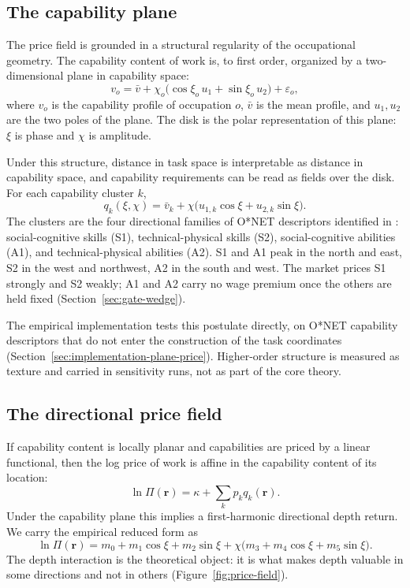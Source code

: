 \documentclass[12pt, a4paper]{article}
\begin{document}
\subsection{The capability plane}
\label{sec:capability-plane}

The price field is grounded in a structural regularity of the
occupational geometry. The capability content of work is, to first
order, organized by a two-dimensional plane in capability space:
\begin{equation}
  v_o
  =
  \bar v
  +
  \chi_o
  \bigl(
    \cos\xi_o\,u_1
    +
    \sin\xi_o\,u_2
  \bigr)
  +
  \varepsilon_o,
  \label{eq:capability-plane}
\end{equation}
where $v_o$ is the capability profile of occupation $o$, $\bar v$ is
the mean profile, and $u_1,u_2$ are the two poles of the plane. The disk
is the polar representation of this plane: $\xi$ is phase and $\chi$ is
amplitude.

Under this structure, distance in task space is interpretable as
distance in capability space, and capability requirements can be read as
fields over the disk. For each capability cluster $k$,
\begin{equation}
  q_k(\xi,\chi)
  =
  \bar v_k
  +
  \chi
  \bigl(
    u_{1,k}\cos\xi
    +
    u_{2,k}\sin\xi
  \bigr).
  \label{eq:capability-field}
\end{equation}
The clusters are the four directional families of O*NET descriptors
identified in \textcite{storck2026geometry}: social-cognitive skills
(S1), technical-physical skills (S2), social-cognitive abilities (A1),
and technical-physical abilities (A2). S1 and A1 peak in the north and
east, S2 in the west and northwest, A2 in the south and west. The
market prices S1 strongly and S2 weakly; A1 and A2 carry no wage
premium once the others are held fixed
(Section~\ref{sec:gate-wedge}).

The empirical implementation tests this postulate directly, on O*NET
capability descriptors that do not enter the construction of the task
coordinates (Section~\ref{sec:implementation-plane-price}).
Higher-order structure is measured as texture and carried in sensitivity
runs, not as part of the core theory.

\subsection{The directional price field}
\label{sec:directional-price}

If capability content is locally planar and capabilities are priced by
a linear functional, then the log price of work is affine in the
capability content of its location:
\[
  \ln \Pi(\mathbf{r})
  =
  \kappa
  +
  \sum_k p_k q_k(\mathbf{r}).
\]
Under the capability plane this implies a first-harmonic directional
depth return. We carry the empirical reduced form as
\begin{equation}
  \ln \Pi(\mathbf{r})
  =
  m_0 + m_1\cos\xi + m_2\sin\xi
  +
  \chi
  \bigl(
    m_3 + m_4\cos\xi + m_5\sin\xi
  \bigr).
  \label{eq:price-field}
\end{equation}
The depth interaction is the theoretical object: it is what makes
depth valuable in some directions and not in others
(Figure~\ref{fig:price-field}).
\end{document}
